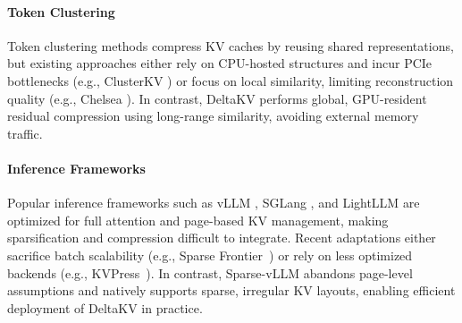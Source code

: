 \paragraph{Token Clustering} 
Token clustering methods compress KV caches by reusing shared representations, but existing approaches either rely on CPU-hosted structures and incur PCIe bottlenecks (e.g., ClusterKV \cite{liu2025clusterkv}) or focus on local similarity, limiting reconstruction quality (e.g., Chelsea \cite{hu2025efficient_chelsea}). 
In contrast, DeltaKV performs global, GPU-resident residual compression using long-range similarity, avoiding external memory traffic.

\paragraph{Inference Frameworks}
Popular inference frameworks such as vLLM \cite{kwon2023efficient_vllm}, SGLang \cite{zheng2024sglang}, and LightLLM \cite{lightllm2} are optimized for full attention and page-based KV management, making sparsification and compression difficult to integrate. 
Recent adaptations either sacrifice batch scalability (e.g., Sparse Frontier~\cite{nawrot2025sparsefrontier}) or rely on less optimized backends (e.g., KVPress~\cite{devoto2025expectedattention_kvpress}).
In contrast, Sparse-vLLM abandons page-level assumptions and natively supports sparse, irregular KV layouts, enabling efficient deployment of DeltaKV in practice.


